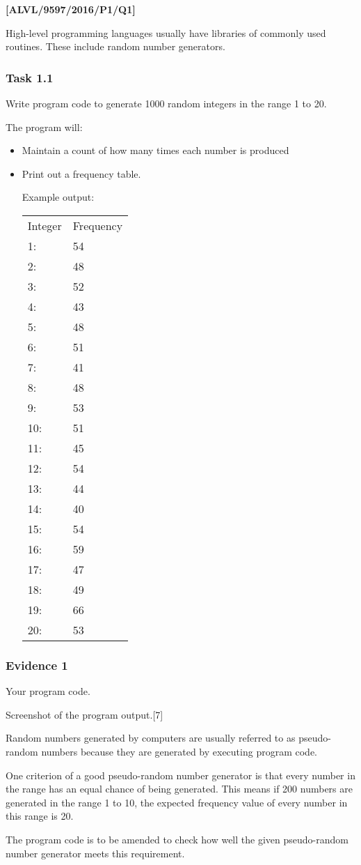 \item \textbf{{[}ALVL/9597/2016/P1/Q1{]} }

High-level programming languages usually have libraries of commonly
used routines. These include random number generators. 

\subsubsection*{Task 1.1}

Write program code to generate 1000 random integers in the range 1
to 20. 

The program will:
\begin{itemize}
\item Maintain a count of how many times each number is produced 
\item Print out a frequency table. 

Example output:

\begin{tabular}{ll}
Integer & Frequency\tabularnewline
1: & 54\tabularnewline
2: & 48\tabularnewline
3: & 52\tabularnewline
4: & 43\tabularnewline
5: & 48\tabularnewline
6: & 51\tabularnewline
7: & 41\tabularnewline
8: & 48\tabularnewline
9: & 53\tabularnewline
10: & 51\tabularnewline
11: & 45\tabularnewline
12: & 54\tabularnewline
13: & 44\tabularnewline
14: & 40\tabularnewline
15: & 54\tabularnewline
16: & 59\tabularnewline
17: & 47\tabularnewline
18: & 49\tabularnewline
19: & 66\tabularnewline
20: & 53\tabularnewline
\end{tabular}
\end{itemize}

\subsubsection*{Evidence 1}

Your program code. 

Screenshot of the program output.\hfill{}{[}7{]}

Random numbers generated by computers are usually referred to as pseudo-random
numbers because they are generated by executing program code. 

One criterion of a good pseudo-random number generator is that every
number in the range has an equal chance of being generated. This means
if 200 numbers are generated in the range 1 to 10, the expected frequency
value of every number in this range is 20. 

The program code is to be amended to check how well the given pseudo-random
number generator meets this requirement.

